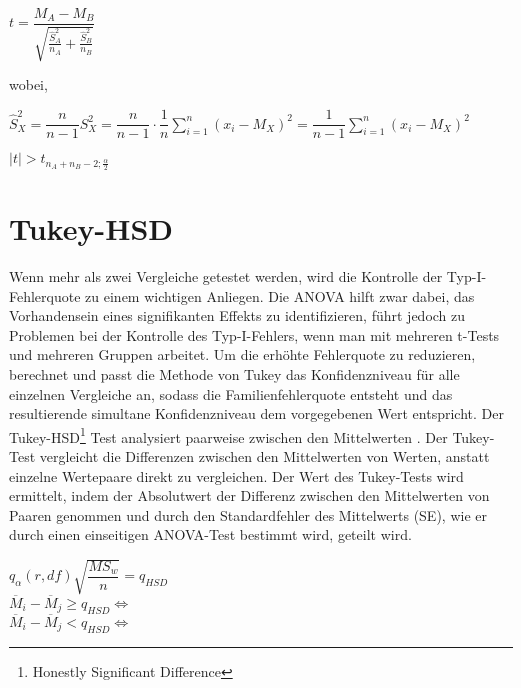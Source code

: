 \begin{center}
  $t = \dfrac{M_A-M_B}{\sqrt{\frac{\hat{S}_A^2}{n_A} + \frac{\hat{S}_B^2}{n_B}}}$
\end{center}

wobei,

\begin{center}
  $\hat{S}_X^2 = \dfrac{n}{n-1} S_X^2 = \dfrac{n}{n-1} \cdot \dfrac{1}{n} \sum_{i=1}^n (x_i - M_X)^2 = \dfrac{1}{n-1} \sum_{i=1}^n (x_i - M_X)^2$
\end{center}

\begin{center}
  $|t| > t_{n_A + n_B - 2; \frac{\alpha}{2}}$
\end{center}



\section{Tukey-HSD}
Wenn mehr als zwei Vergleiche getestet werden, wird die Kontrolle der Typ-I-Fehlerquote zu einem wichtigen Anliegen. 
Die ANOVA hilft zwar dabei, das Vorhandensein eines signifikanten Effekts zu identifizieren, 
führt jedoch zu Problemen bei der Kontrolle des Typ-I-Fehlers, wenn man mit mehreren t-Tests und mehreren Gruppen arbeitet.
Um die erhöhte Fehlerquote zu reduzieren, berechnet und passt die Methode von Tukey das Konfidenzniveau für alle einzelnen Vergleiche an, 
sodass die Familienfehlerquote entsteht und das resultierende simultane Konfidenzniveau dem vorgegebenen Wert entspricht.
Der Tukey-HSD\footnote{Honestly Significant Difference} Test analysiert paarweise
zwischen den Mittelwerten \cite{tukey_HSD}.
Der Tukey-Test vergleicht die Differenzen zwischen den Mittelwerten von Werten, anstatt einzelne Wertepaare direkt zu vergleichen. 
Der Wert des Tukey-Tests wird ermittelt, indem der Absolutwert der Differenz zwischen den Mittelwerten von Paaren genommen und 
durch den Standardfehler des Mittelwerts (SE), wie er durch einen einseitigen ANOVA-Test bestimmt wird, geteilt wird.

\begin{center}
  $q_{\alpha}(r, df){\sqrt{\dfrac{MS_w}{n}}} = q_{HSD}$ \\
  $\overline{M}_i - \overline{M}_j \geq q_{HSD} \iff$  \\
  $\overline{M}_i - \overline{M}_j < q_{HSD} \iff$  
\end{center}

